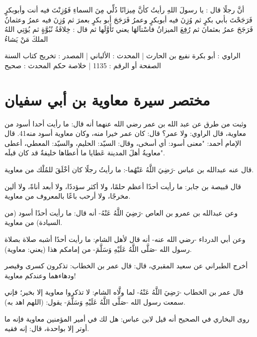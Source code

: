 أنَّ رجلًا قال : يا رسولَ اللهِ رأيتُ كأنَّ مِيزانًا دُلِّي مِنَ السماءِ فَوُزِنْتَ فيه أنت وأبوبكرٍ فَرَجَحْتَ بأبي بكرٍ ثم وُزِنَ فيه أبوبكرٍ وعمرُ فَرَجَحَ أبو بكرٍ بعمرَ ثم وُزِنَ فيه عمرُ وعثمانُ فَرَجَحَ عمرُ بعثمانَ ثم رُفِعَ الميزانُ فاسْتآلهَا يعني تَأَوَّلَها ثم قال : خِلافَةُ نُبُوَّةٍ ثم يُؤتِي اللهُ الملكَ مَنْ يَشاءُ

الراوي : أبو بكرة نفيع بن الحارث | المحدث : الألباني | المصدر : تخريج كتاب السنة
الصفحة أو الرقم : 1135 | خلاصة حكم المحدث : صحيح 

\section{مختصر سيرة معاوية بن أبي سفيان}


وثبت من طرق عن عبد الله بن عمر رضي الله عنهما أنه قال: ما رأيت أحدا أسود من معاوية، قال الراوي: ولا عمر؟ قال: كان عمر خيرا منه، وكان معاوية أسود منه41.
قال الإمام أحمد: "معنى أسود: أي أسخى، وقال: السيّد: الحليم، والسيّد: المعطي، أعطى معاويةُ أهلَ المدينة عَطايا ما أعطاها خليفةٌ قد كان قبلَه".

قال عنه عبدالله بن عباس -رَضِيَ اللَّهُ عَنْهُما-: ما رأيتُ رجلًا كان أخْلَقَ للمُلْك من معاوية.

قال قبيصة بن جابر: ما رأيت أحدًا أعظم حلمًا، ولا أكثر سؤددًا، ولا أبعد أناةً، ولا ألين مخرجًا، ولا أرحب باعًا بالمعروف من معاوية.

وعن عبدالله بن عمرو بن العاص -رَضِيَ اللَّهُ عَنْهُ- أنه قال: ما رأيت أحدًا أسود (من السيادة) من معاوية.

وعن أبي الدرداء -رضي الله عنه- أنه قال لأهل الشام: ما رأيت أحدًا أشبه صلاة بصلاة رسول الله -صَلَّى اللَّهُ عَلَيْهِ وَسَلَّمَ- من إمامكم هذا (يعني: معاوية).

أخرج الطبراني عن سعيد المقبري، قال: قال عمر بن الخطاب: تذكرون كسرى وقيصر ودهاءهما وعندكم معاوية!

قال عمر بن الخطاب -رَضِيَ اللَّهُ عَنْهُ- لما ولَّاه الشام: لا تذكروا معاوية إلا بخير؛ فإني سمعت رسول الله -صَلَّى اللَّهُ عَلَيْهِ وَسَلَّمَ- يقول: (اللهم اهد به).

روى البخاري في الصحيح أنه قيل لابن عباس: هل لك في أمير المؤمنين معاوية فإنه ما أوتر إلا بواحدة، قال: إنه فقيه.

